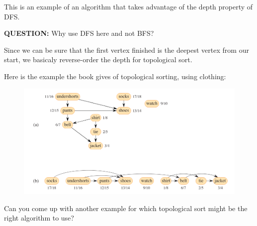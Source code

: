\documentclass[12pt]{article}
\begin{document}
This is an example of an algorithm that takes advantage of the depth property of DFS. 

\textbf{QUESTION:} Why use DFS here and not BFS? 

Since we can be sure that the first vertex finished is the deepest vertex from our start, we basicaly reverse-order the depth for topological sort. 

Here is the example the book gives of topological sorting, using clothing:

\begin{figure}[h]
    \includegraphics[width=\textwidth]{topo-sort.png}
\end{figure}

Can you come up with another example for which topological sort might be the right algorithm to use? 
\end{document}
